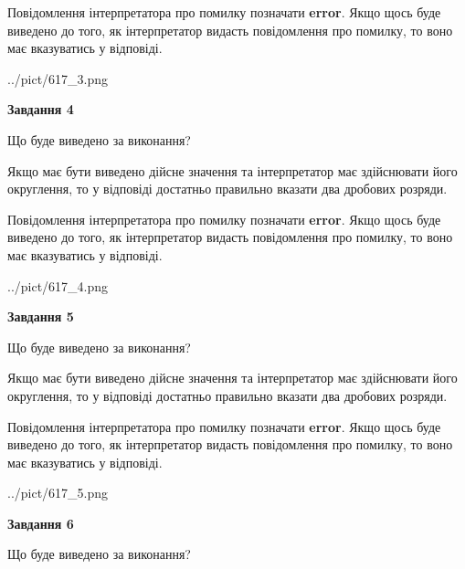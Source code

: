 \documentclass[12pt, ukrainian]{article}
\begin{document}
{\begin {Large}
Повідомлення інтерпретатора про помилку позначати \textbf{error}.
Якщо щось буде виведено до того, як інтерпретатор видасть повідомлення про помилку, 
то воно має вказуватись у відповіді. \par

\begin{center}
	{../pict/617_3.png}
\end{center}
\newpage

{\begin {center}\textbf{Завдання 4}\end {center}}\par
Що буде виведено за виконання? \par

Якщо має бути виведено дійсне значення та інтерпретатор має здійснювати його округлення, 
то у відповіді достатньо правильно вказати два дробових розряди.

Повідомлення інтерпретатора про помилку позначати \textbf{error}.
Якщо щось буде виведено до того, як інтерпретатор видасть повідомлення про помилку, 
то воно має вказуватись у відповіді. \par

\begin{center}
	{../pict/617_4.png}
\end{center}
\newpage

{\begin {center}\textbf{Завдання 5}\end {center}}\par
Що буде виведено за виконання? \par

Якщо має бути виведено дійсне значення та інтерпретатор має здійснювати його округлення, 
то у відповіді достатньо правильно вказати два дробових розряди.

Повідомлення інтерпретатора про помилку позначати \textbf{error}.
Якщо щось буде виведено до того, як інтерпретатор видасть повідомлення про помилку, 
то воно має вказуватись у відповіді. \par

\begin{center}
	{../pict/617_5.png}
\end{center}
\newpage

{\begin {center}\textbf{Завдання 6}\end {center}}\par
Що буде виведено за виконання? \par


\end{Large}}
\end{document}
